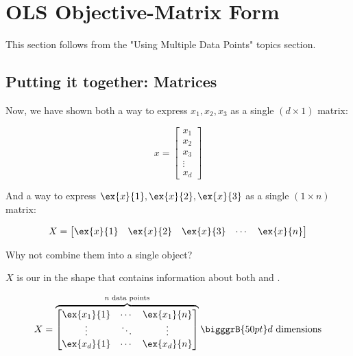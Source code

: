 \section*{OLS Objective-Matrix Form}
   
This section follows from the "Using Multiple Data Points" topics section.
    
    \subsection*{Putting it together: Matrices}
    
        Now, we have shown both a way to express $x_1, x_2, x_3$ as a single $(d \times 1)$ matrix:
        
        \begin{equation}
            x = 
            \begin{bmatrix}
              x_1 \\ x_2 \\ x_3 \\ \vdots \\ x_d
            \end{bmatrix}
        \end{equation}
        
        And a way to express $\ex{x}{1}, \ex{x}{2}, \ex{x}{3}$ as a single $(1 \times n)$ matrix:
        
        \begin{equation}
            X =
                \begin{bmatrix}
                  \ex{x}{1} & \ex{x}{2} & \ex{x}{3} & \cdots & \ex{x}{n}
                \end{bmatrix}
        \end{equation}
        
        Why not combine them into a single object?\\
        
        \begin{kequation}
            $X$ is our  in the shape  that contains information about both  and .
            
            \begin{equation}
                    X = 
                        \overbrace{
                            \begin{bmatrix}
                                \ex{x_1}{1} & \cdots  & \ex{x_1}{n} \\
                                \vdots      & \ddots & \vdots      \\
                                \ex{x_d}{1} & \cdots  & \ex{x_d}{n}
                            \end{bmatrix}
                            }^{ n \text{ data points}}
                        \bigggrB{50pt} d \text{ dimensions}
            \end{equation}

        \end{kequation}
        
